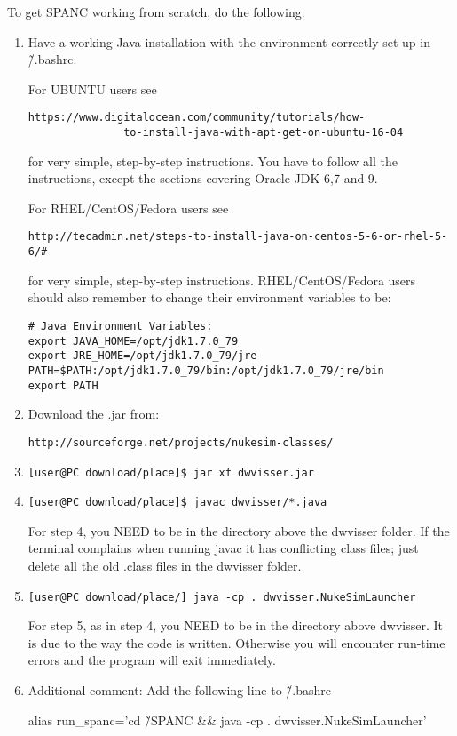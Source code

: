 \documentclass[11pt]{report}
\begin{document}
To get SPANC working from scratch, do the following:
\begin{enumerate}
\item
Have a working Java installation with the environment correctly set up in \~/.bashrc.

For UBUNTU users see
\begin{verbatim} 
https://www.digitalocean.com/community/tutorials/how-
               to-install-java-with-apt-get-on-ubuntu-16-04
\end{verbatim} 
for very simple, step-by-step instructions.
You have to follow all the instructions, except the sections covering Oracle JDK 6,7 and 9.


For RHEL/CentOS/Fedora  users see
\begin{verbatim} 
http://tecadmin.net/steps-to-install-java-on-centos-5-6-or-rhel-5-6/#
\end{verbatim} 
for very simple, step-by-step instructions.
RHEL/CentOS/Fedora users should also remember to change their
environment variables to be:
\begin{verbatim}
# Java Environment Variables:
export JAVA_HOME=/opt/jdk1.7.0_79
export JRE_HOME=/opt/jdk1.7.0_79/jre
PATH=$PATH:/opt/jdk1.7.0_79/bin:/opt/jdk1.7.0_79/jre/bin
export PATH
\end{verbatim} 

\item
Download the .jar from: 
\begin{verbatim} 
http://sourceforge.net/projects/nukesim-classes/
\end{verbatim} 

\item
\begin{verbatim} 
[user@PC download/place]$ jar xf dwvisser.jar
\end{verbatim} 

\item
\begin{verbatim}
[user@PC download/place]$ javac dwvisser/*.java
\end{verbatim} 

For step 4, you NEED to be in the directory above the dwvisser folder. 
If the terminal complains when running javac it has conflicting class files; 
just delete all the old .class files in the dwvisser folder.

\item
\begin{verbatim}
[user@PC download/place/] java -cp . dwvisser.NukeSimLauncher
\end{verbatim} 

For step 5, as in step 4, you NEED to be in the directory above dwvisser. 
It is due to the way the code is written. Otherwise you will encounter 
run-time errors and the program will exit immediately.


\item
Additional comment:
Add the following line to \~/.bashrc

alias run\_spanc='cd \~/SPANC \&\& java -cp . dwvisser.NukeSimLauncher'

\end{enumerate}
\end{document}
